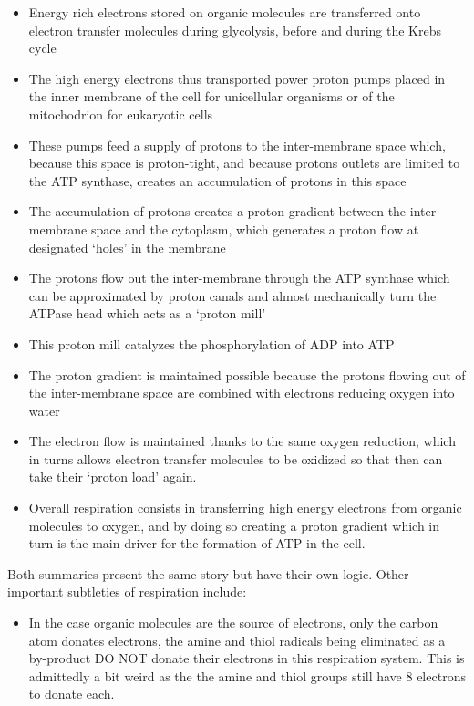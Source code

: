 \documentclass[]{book}
\providecommand{\tightlist}{%
  \setlength{\itemsep}{0pt}\setlength{\parskip}{0pt}}
\theoremstyle{definition}
\theoremstyle{definition}
\theoremstyle{definition}
\theoremstyle{remark}
\begin{document}
\begin{itemize}
\tightlist
\item
  Energy rich electrons stored on organic molecules are transferred onto
  electron transfer molecules during glycolysis, before and during the
  Krebs cycle
\item
  The high energy electrons thus transported power proton pumps placed
  in the inner membrane of the cell for unicellular organisms or of the
  mitochodrion for eukaryotic cells
\item
  These pumps feed a supply of protons to the inter-membrane space
  which, because this space is proton-tight, and because protons outlets
  are limited to the ATP synthase, creates an accumulation of protons in
  this space
\item
  The accumulation of protons creates a proton gradient between the
  inter-membrane space and the cytoplasm, which generates a proton flow
  at designated `holes' in the membrane
\item
  The protons flow out the inter-membrane through the ATP synthase which
  can be approximated by proton canals and almost mechanically turn the
  ATPase head which acts as a `proton mill'
\item
  This proton mill catalyzes the phosphorylation of ADP into ATP
\item
  The proton gradient is maintained possible because the protons flowing
  out of the inter-membrane space are combined with electrons reducing
  oxygen into water
\item
  The electron flow is maintained thanks to the same oxygen reduction,
  which in turns allows electron transfer molecules to be oxidized so
  that then can take their `proton load' again.
\item
  Overall respiration consists in transferring high energy electrons
  from organic molecules to oxygen, and by doing so creating a proton
  gradient which in turn is the main driver for the formation of ATP in
  the cell.
\end{itemize}

Both summaries present the same story but have their own logic. Other
important subtleties of respiration include:

\begin{itemize}
\tightlist
\item
  In the case organic molecules are the source of electrons, only the
  carbon atom donates electrons, the amine and thiol radicals being
  eliminated as a by-product DO NOT donate their electrons in this
  respiration system. This is admittedly a bit weird as the the amine
  and thiol groups still have 8 electrons to donate each.
\end{itemize}
\end{document}
